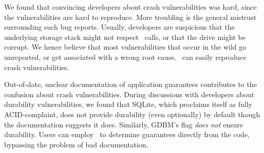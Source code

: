 
We found that convincing developers about crash vulnerabilities was hard, since
the vulnerabilities are hard to
reproduce. More troubling is the general mistrust surrounding such bug reports.
Usually, developers are suspicious that the underlying storage stack might not
respect \fsyncSC\ calls, or that the drive might be corrupt. We hence believe
that most vulnerabilities that occur in the wild go unreported, or get
associated with a wrong root cause. %
\toolname\ can easily
reproduce crash vulnerabilities. 

Out-of-date, unclear documentation of application guarantees contributes to the
confusion about crash vulnerabilities. During discussions with developers about
durability vulnerabilities, we found that SQLite, which proclaims itself as
fully ACID-complaint, does not provide durability (even optionally) 
by default though the documentation suggests it does. Similarly,
GDBM's  flag \textit{does not} ensure durability. Users can
employ \toolname\ to determine guarantees directly from the code, bypassing the
problem of bad documentation.
